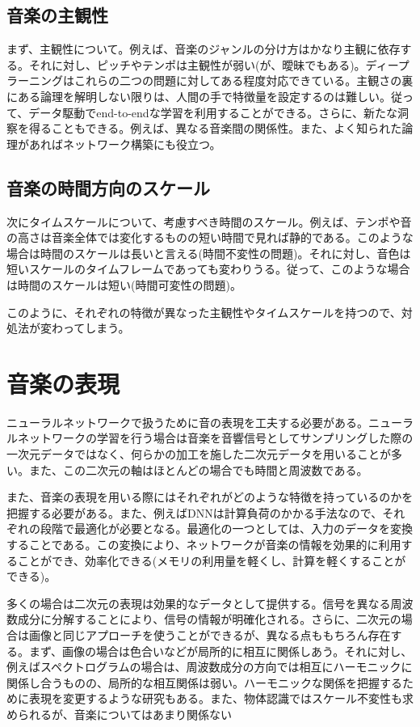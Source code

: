 \subsection{音楽の主観性}

まず、主観性について。例えば、音楽のジャンルの分け方はかなり主観に依存する。それに対し、ピッチやテンポは主観性が弱い(が、曖昧でもある)。ディープラーニングはこれらの二つの問題に対してある程度対応できている。主観さの裏にある論理を解明しない限りは、人間の手で特徴量を設定するのは難しい。従って、データ駆動でend-to-endな学習を利用することができる。さらに、新たな洞察を得ることもできる。例えば、異なる音楽間の関係性。また、よく知られた論理があればネットワーク構築にも役立つ。

\subsection{音楽の時間方向のスケール}

次にタイムスケールについて、考慮すべき時間のスケール。例えば、テンポや音の高さは音楽全体では変化するものの短い時間で見れば静的である。このような場合は時間のスケールは長いと言える(時間不変性の問題)。それに対し、音色は短いスケールのタイムフレームであっても変わりうる。従って、このような場合は時間のスケールは短い(時間可変性の問題)。

このように、それぞれの特徴が異なった主観性やタイムスケールを持つので、対処法が変わってしまう。

\section{音楽の表現}
\label{sec:preprocess}

ニューラルネットワークで扱うために音の表現を工夫する必要がある。ニューラルネットワークの学習を行う場合は音楽を音響信号としてサンプリングした際の一次元データではなく、何らかの加工を施した二次元データを用いることが多い。また、この二次元の軸はほとんどの場合でも時間と周波数である。

また、音楽の表現を用いる際にはそれぞれがどのような特徴を持っているのかを把握する必要がある。また、例えばDNNは計算負荷のかかる手法なので、それぞれの段階で最適化が必要となる。最適化の一つとしては、入力のデータを変換することである。この変換により、ネットワークが音楽の情報を効果的に利用することができ、効率化できる(メモリの利用量を軽くし、計算を軽くすることができる)。

多くの場合は二次元の表現は効果的なデータとして提供する。信号を異なる周波数成分に分解することにより、信号の情報が明確化される。さらに、二次元の場合は画像と同じアプローチを使うことができるが、異なる点ももちろん存在する。まず、画像の場合は色合いなどが局所的に相互に関係しあう。それに対し、例えばスペクトログラムの場合は、周波数成分の方向では相互にハーモニックに関係し合うものの、局所的な相互関係は弱い。ハーモニックな関係を把握するために表現を変更するような研究もある。また、物体認識ではスケール不変性も求められるが、音楽についてはあまり関係ない

